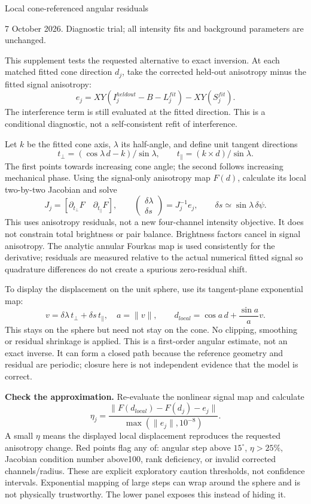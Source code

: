 \documentclass[10pt,a4paper]{article}
\begin{document}
{\LARGE Local cone-referenced angular residuals}\par
7 October 2026. Diagnostic trial; all intensity fits and background parameters are unchanged.

This supplement tests the requested alternative to exact inversion. At each matched fitted cone direction $d_j$, take the corrected held-out anisotropy minus the fitted signal anisotropy:
\[e_j=XY(I^{heldout}_j-B-L_j^{fit})-XY(S_j^{fit}).\]
The interference term is still evaluated at the fitted direction. This is a conditional diagnostic, not a self-consistent refit of interference.

Let $k$ be the fitted cone axis, $\lambda$ its half-angle, and define unit tangent directions
\[t_\perp=(\cos\lambda\,d-k)/\sin\lambda,\qquad t_\parallel=(k\times d)/\sin\lambda.\]
The first points towards increasing cone angle; the second follows increasing mechanical phase. Using the signal-only anisotropy map $F(d)$, calculate its local two-by-two Jacobian and solve
\[J_j=\left[\partial_{t_\perp}F\quad\partial_{t_\parallel}F\right],\qquad
\begin{pmatrix}\delta\lambda\\\delta s\end{pmatrix}=J_j^{-1}e_j,
\qquad \delta s\simeq\sin\lambda\,\delta\psi.\]
This uses anisotropy residuals, not a new four-channel intensity objective. It does not constrain total brightness or pair balance. Brightness factors cancel in signal anisotropy. The analytic annular Fourkas map is used consistently for the derivative; residuals are measured relative to the actual numerical fitted signal so quadrature differences do not create a spurious zero-residual shift.

To display the displacement on the unit sphere, use its tangent-plane exponential map:
\[v=\delta\lambda\,t_\perp+\delta s\,t_\parallel,\quad a=\|v\|,\qquad
 d_{local}=\cos a\,d+\frac{\sin a}{a}v.\]
This stays on the sphere but need not stay on the cone. No clipping, smoothing or residual shrinkage is applied. This is a first-order angular estimate, not an exact inverse. It can form a closed path because the reference geometry and residual are periodic; closure here is not independent evidence that the model is correct.

\textbf{Check the approximation.} Re-evaluate the nonlinear signal map and calculate
\[\eta_j=\frac{\|F(d_{local})-F(d_j)-e_j\|}{\max(\|e_j\|,10^{-8})}.\]
A small $\eta$ means the displayed local displacement reproduces the requested anisotropy change. Red points flag any of: angular step above $15^\circ$, $\eta>25\%$, Jacobian condition number above100, rank deficiency, or invalid corrected channels/radius. These are explicit exploratory caution thresholds, not confidence intervals. Exponential mapping of large steps can wrap around the sphere and is not physically trustworthy. The lower panel exposes this instead of hiding it.
\end{document}
